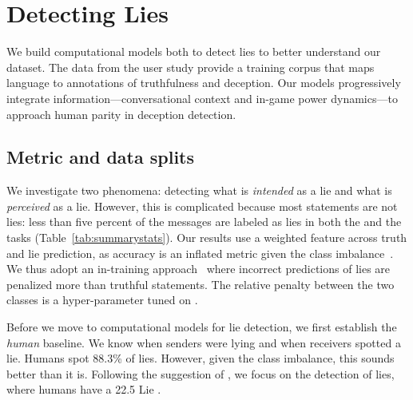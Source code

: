 \section{Detecting Lies}
\label{sec:models}


We build computational models both to detect lies to better understand
our dataset.
%
The data from the user study provide a training corpus that maps
language to annotations of truthfulness and deception.
%
Our models progressively integrate information---conversational
context and in-game power dynamics---to approach human parity in
deception detection.

\subsection{Metric and data splits}

We investigate two phenomena: detecting what is \textit{intended} as a
lie and what is \textit{perceived} as a lie.
%
However, this is complicated because most statements are not lies:
less than five percent of the messages are labeled as lies in both the
\textit{\alie} and the \textit{\slie}
tasks (Table~\ref{tab:summarystats}).
%
Our results use a weighted \fone{} feature across truth and lie
prediction, as accuracy is an inflated metric given the class
imbalance~\citep{japkowicz2002class}.
%
We thus adopt an in-training approach~\citep{zhou2005training} where
incorrect predictions of lies are penalized more than truthful
statements.
%
The relative penalty between the two classes is a hyper-parameter
tuned on \fone{}.

Before we move to computational models for lie detection, we first
establish the \textit{human} baseline.
%
We know when senders were lying and when receivers spotted a lie.
%
Humans spot 88.3\% of lies.
%
However, given the class imbalance, this sounds better than it is.  
%
Following the suggestion of \citep{levine-99}, we focus on the detection of lies, where humans have a 22.5 Lie \fone{}.



%
%
%
%



